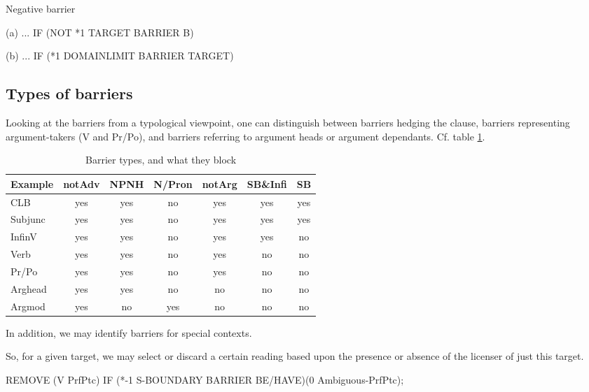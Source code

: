 \documentclass[a4paper,english]{article} %
\begin{document}
\begin{example}\label{nega-barriers}
Negative barrier
\item[(a)] ... IF (NOT *1 TARGET BARRIER B)
\item[(b)] ... IF (*1 DOMAINLIMIT BARRIER TARGET)
\end{example}


\subsection{Types of barriers}

Looking at the barriers from a typological viewpoint, one can distinguish between barriers hedging the clause, barriers representing argument-takers (V and Pr/Po), and barriers referring to argument heads or argument dependants. Cf. table \ref{btypol}.%

\begin{table}[htdp]
\caption{Barrier types, and what they block}
\begin{center}
\begin{tabular}{|l|c|c|c|c|c|c|}
\hline
Example &  notAdv  & NPNH & N/Pron & notArg & SB\&Infi & SB  \\ \hline
CLB     &  yes     & yes  & no     & yes    & yes     & yes \\
Subjunc &  yes     & yes  & no     & yes    & yes     & yes \\ 
\hline
InfinV  &  yes     & yes  & no     & yes    & yes     & no  \\
Verb    &  yes     & yes  & no     & yes    & no      & no  \\
Pr/Po   &  yes     & yes  & no     & yes    & no      & no  \\
\hline
Arghead &  yes     & yes   & no     & no     & no      & no  \\
Argmod  &  yes     & no    & yes    & no     & no      & no  \\ 
\hline
\end{tabular}
\end{center}
\label{btypol}
\end{table}%


In addition, we may identify barriers for special contexts.%

So, for a given target, we may select or discard a certain reading based upon the presence or absence of the licenser of just this target.%

\begin{example}
REMOVE (V PrfPtc) IF (*-1 S-BOUNDARY BARRIER BE/HAVE)(0 Ambiguous-PrfPtc);
\end{example}
\end{document}
